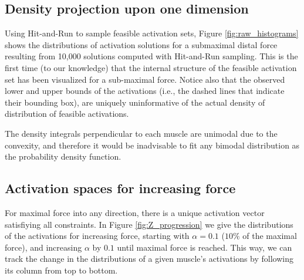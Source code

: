 \subsection{Density projection upon one dimension} %
\label{ssub:density_projection_upon_one_dimension}


Using Hit-and-Run to sample feasible activation sets, Figure \ref{fig:raw_histograms} shows the distributions of activation solutions for a submaximal distal force resulting from 10,000 solutions computed with Hit-and-Run sampling.
This is the first time (to our knowledge) that the internal structure of the feasible activation set has been visualized for a sub-maximal force.
Notice also that the observed lower and upper bounds of the activations (i.e., the dashed lines that indicate their bounding box), are uniquely uninformative of the actual density of distribution of feasible activations.

The density integrals perpendicular to each muscle are unimodal due to the convexity\cite{ball1997elementary}, and therefore it would be inadvisable to fit any bimodal distribution as the probability density function.

\subsection{Activation spaces for increasing force} %
\label{sub:activation_spaces_for_increasing_force}
For maximal force into any direction, there is a unique activation vector satisfiying all constraints.
In Figure \ref{fig:Z_progression} we give the distributions of the activations for increasing force, starting with $\alpha=0.1$ ($10\%$ of the maximal force), and increasing $\alpha$ by $0.1$ until maximal force is reached.
This way, we can track the change in the distributions of a given muscle's activations by following its column from top to bottom.

